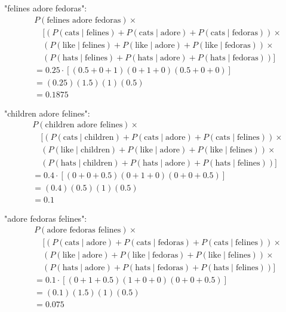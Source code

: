 \documentclass[a4 paper]{article}
\numberwithin{equation}{section}
\newcommand{\0}{\mathbf{0}}
\begin{document}
"felines adore fedoras":
\begin{align*}
    &P(\text{felines adore fedoras}) \times \\
    &\quad \Big[ 
        \left( P(\text{cats} \mid \text{felines}) + P(\text{cats} \mid \text{adore}) + P(\text{cats} \mid \text{fedoras}) \right) \times \\
    &\quad \left( P(\text{like} \mid \text{felines}) + P(\text{like} \mid \text{adore}) + P(\text{like} \mid \text{fedoras}) \right) \times \\
    &\quad \left( P(\text{hats} \mid \text{felines}) + P(\text{hats} \mid \text{adore}) + P(\text{hats} \mid \text{fedoras}) \right) 
    \Big] \\
    &= 0.25 \cdot \left[ (0.5 + 0 + 1)(0 + 1 + 0)(0.5 + 0 + 0) \right] \\
    &= (0.25)(1.5)(1)(0.5) \\
    &= 0.1875
\end{align*}
\newline

"children adore felines":
\begin{align*}
    &P(\text{children adore felines}) \times \\
    &\quad \Big[ 
        \left( P(\text{cats} \mid \text{children}) + P(\text{cats} \mid \text{adore}) + P(\text{cats} \mid \text{felines}) \right) \times \\
    &\quad \left( P(\text{like} \mid \text{children}) + P(\text{like} \mid \text{adore}) + P(\text{like} \mid \text{felines}) \right) \times \\
    &\quad \left( P(\text{hats} \mid \text{children}) + P(\text{hats} \mid \text{adore}) + P(\text{hats} \mid \text{felines}) \right) 
    \Big] \\
    &= 0.4 \cdot \left[ (0 + 0 + 0.5)(0 + 1 + 0)(0 + 0 + 0.5) \right] \\
    &= (0.4)(0.5)(1)(0.5) \\
    &= 0.1
\end{align*}
\newline

"adore fedoras felines":
\begin{align*}
    &P(\text{adore fedoras felines}) \times \\
    &\quad \Big[ 
        \left( P(\text{cats} \mid \text{adore}) + P(\text{cats} \mid \text{fedoras}) + P(\text{cats} \mid \text{felines}) \right) \times \\
    &\quad \left( P(\text{like} \mid \text{adore}) + P(\text{like} \mid \text{fedoras}) + P(\text{like} \mid \text{felines}) \right) \times \\
    &\quad \left( P(\text{hats} \mid \text{adore}) + P(\text{hats} \mid \text{fedoras}) + P(\text{hats} \mid \text{felines}) \right) 
    \Big] \\
    &= 0.1 \cdot \left[ (0 + 1 + 0.5)(1 + 0 + 0)(0 + 0 + 0.5) \right] \\
    &= (0.1)(1.5)(1)(0.5) \\
    &= 0.075
\end{align*}
\newline
\end{document}
